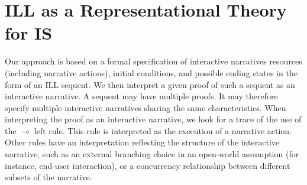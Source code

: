 \documentclass[runningheads,a4paper]{llncs}
\begin{document}
\section{ILL as a Representational Theory for IS}
%
Our approach is based on a formal specification of interactive narratives resources (including narrative actions), initial conditions, and possible ending states in the form of an ILL sequent. We then interpret a given proof of such a sequent as an interactive narrative. A sequent may have multiple proofs. It may therefore specify multiple interactive narratives sharing the same characteristics. When interpreting the proof as an interactive narrative, we look for a trace of the use of the $\multimap$ left rule. This rule is interpreted as the execution of a narrative action. Other rules have an interpretation reflecting the structure of the interactive narrative, such as an external branching choice in an open-world assumption (for instance, end-user interaction), or a concurrency relationship between different subsets of the narrative. 
\end{document}
